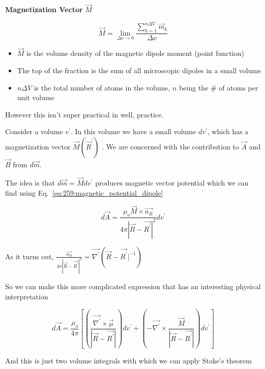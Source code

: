 \documentclass[10pt]{article}
\begin{document}
\begin{definition}
	\textbf{Magnetization Vector}  $\vec{M} $ 

	\begin{equation}
	\vec{M} = \lim_{\Delta \nu \to 0} \frac{ \sum_{k = 1}^{n \Delta V}\vec{m}_k }{ \Delta \nu}
	\label{eq:259:magnetization_vector}
	\end{equation} 

	\begin{itemize}
		\item $\vec{M} $ is the volume density of the magnetic dipole moment (point function)
		\item The top of the fraction is the sum of all microscopic dipoles in a small volume 
		\item $ n \Delta V $ is the total number of atoms in the volume, $ n $ being the \# of atoms per unit volume
	\end{itemize}

	However this isn't super practical in well, practice.
\end{definition}

Consider a volume $ v^\prime $.
In this volume we have a small volume $ dv^\prime $, which has a magnetization vector $\vec{M}(\vec{R}^\prime )$ .
We are concerned with the contribution to $\vec{A} $  and $\vec{B} $ from $ d \vec{m}  $.

The idea is that $ d \vec{m} =	\vec{M}	dv^\prime$ produces magnetic vector potential which we can find using Eq.~\ref{eq:259:magnetic_potential_dipole}


\begin{equation}
	d \vec{A} = \frac{\mu_o \vec{M} \times  \vec{a_R} }{4\pi |\vec{R} - \vec{R^\prime}|^2} dv^\prime
\end{equation}


As it turns out, $ \frac{\vec{a_R} }{4\pi |\vec{R} - \vec{R^\prime}|^2} = \vec{\nabla^\prime} (\vec{R} - \vec{R^\prime}|^{-1}) $  

So we can make this more complicated expression that has an interesting physical interpretation

\begin{equation}
	d \vec{A} = \frac{\mu_o}{4\pi} \left[ \left( \frac{\vec{\nabla^\prime} \times \vec{\mu} }{|\vec{R} - \vec{R^\prime}|} \right)  dv^\prime +  \left( - \vec{\nabla^\prime} \times  \frac{\vec{M}}{|\vec{R} - \vec{R^\prime}| } \right) dv^\prime \right]
\end{equation}


And this is just two volume integrals with which we can apply Stoke's theorem
\end{document}
